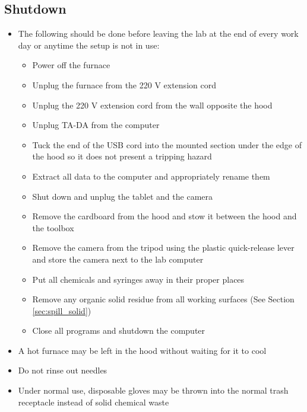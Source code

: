 \documentclass[letterpaper,11pt]{article}
\begin{document}
    \subsection{Shutdown}
    \begin{itemize}
    \item The following should be done before leaving the lab at the end of 
        every work day or anytime the setup is not in use:
        \begin{itemize}
        \item Power off the furnace
        \item Unplug the furnace from the 220 V extension cord
        \item Unplug the 220 V extension cord from the wall opposite the hood
        \item Unplug TA-DA from the computer 
        \item Tuck the end of the USB cord into the mounted section under the 
            edge of the hood so it does not present a tripping hazard
        \item Extract all data to the computer and appropriately rename them
        \item Shut down and unplug the tablet and the camera
        \item Remove the cardboard from the hood and stow it between the hood 
            and the toolbox
        \item Remove the camera from the tripod using the plastic quick-release 
            lever and store the camera next to the lab computer
        \item Put all chemicals and syringes away in their proper places
        \item Remove any organic solid residue from all working surfaces 
            (See Section \ref{sec:spill_solid})
        \item Close all programs and shutdown the computer
        \end{itemize}
    
    \item A hot furnace may be left in the hood without waiting for it to cool
    \item Do not rinse out needles %
    \item Under normal use, disposable gloves may be thrown into the normal 
        trash receptacle instead of solid chemical waste
    \end{itemize}
    
\end{document}
